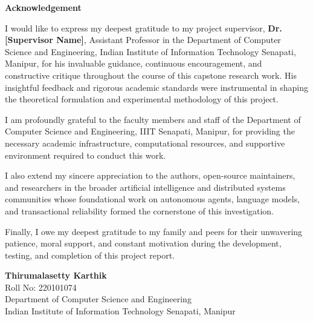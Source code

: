 \documentclass[a4paper, 11pt, oneside]{report}
\begin{document}
    \pagebreak
    	
    \begin{center}
        { \LARGE \textbf{Acknowledgement}}
    \end{center}
	\vspace{1cm}
	I would like to express my deepest gratitude to my project supervisor, \textbf{Dr. [Supervisor Name]}, Assistant Professor in the Department of Computer Science and Engineering, Indian Institute of Information Technology Senapati, Manipur, for his invaluable guidance, continuous encouragement, and constructive critique throughout the course of this capstone research work. His insightful feedback and rigorous academic standards were instrumental in shaping the theoretical formulation and experimental methodology of this project.

    I am profoundly grateful to the faculty members and staff of the Department of Computer Science and Engineering, IIIT Senapati, Manipur, for providing the necessary academic infrastructure, computational resources, and supportive environment required to conduct this work.

    I also extend my sincere appreciation to the authors, open-source maintainers, and researchers in the broader artificial intelligence and distributed systems communities whose foundational work on autonomous agents, language models, and transactional reliability formed the cornerstone of this investigation.

    Finally, I owe my deepest gratitude to my family and peers for their unwavering patience, moral support, and constant motivation during the development, testing, and completion of this project report.
	
	\vspace{1.5cm}
	\begin{flushright}
	    \textbf{Thirumalasetty Karthik} \\
	    Roll No: 220101074 \\
	    Department of Computer Science and Engineering \\
	    Indian Institute of Information Technology Senapati, Manipur
	\end{flushright}

	\newpage
	
	\tableofcontents
    \newpage
	\listoffigures
    \newpage
    \listoftables
    \newpage
\end{document}
